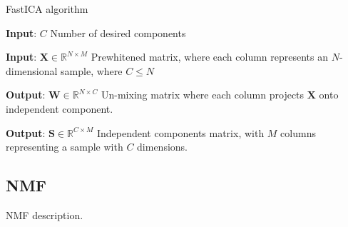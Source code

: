 \documentclass[../main.tex]{subfiles} %
\begin{document}
\begin{algorithm} 
\begin{algorithmic}
\caption{FastICA algorithm}\label{fastica}
\item \textbf{Input}: $C$ Number of desired components
\item \textbf{Input}: $\mathbf{X} \in \mathbb{R}^{N \times M}$ Prewhitened matrix, where each column represents an $N$-dimensional sample, where $C \le N$ 
\item \textbf{Output}: $\mathbf{W} \in \mathbb{R}^{N \times C}$ Un-mixing matrix where each column projects $\mathbf{X}$ onto independent component.
\item \textbf{Output}: $\mathbf{S} \in \mathbb{R}^{C \times M}$ Independent components matrix, with $M$ columns representing a sample with $C$ dimensions.

	\EndWhile
\EndFor
{}
\EndFunction

\end{algorithmic}
\end{algorithm}



\subsection{NMF}

NMF description.	
\end{document}

